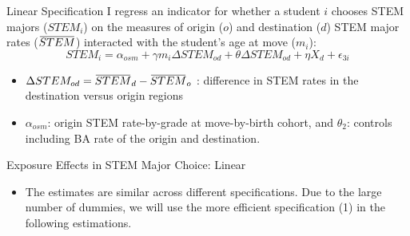 \documentclass[aspectratio=169,xcolor=dvipsnames]{beamer}
\newcommand{\overbar}[1]{\mkern 1.5mu\overline{\mkern-1.5mu#1\mkern-1.5mu}\mkern 1.5mu}
\begin{document}
\begin{frame}{Linear Specification}\label{}
I regress an indicator for whether a student $i$ chooses STEM majors ($STEM_i$) on the measures of origin ($o$) and destination ($d$) STEM major rates ($\overbar{STEM}$) interacted with the student’s age at move ($m_i$): 
\begin{equation}\label{eq:}
	  STEM_i =  \alpha_{osm} + \gamma m_i \Delta STEM_{od} + \theta \Delta STEM_{od} + \eta X_{d} + \epsilon_{3i}
    \end{equation}
\begin{itemize}
    \item $\Delta STEM_{od} = \overbar{STEM}_d -  \overbar{STEM}_o$ : difference in STEM rates in the destination versus origin regions
    \item $\alpha_{osm}$: origin STEM rate-by-grade at move-by-birth cohort, and $\theta_2$: controls including BA rate of the origin and destination.

\end{itemize}
\end{frame}

\begin{frame}{Exposure Effects in STEM Major Choice: Linear}\label{tab_main}
    \begin{table}[!htbp]
	\centering \footnotesize
	\captionsetup{width=1.0\textwidth}	
\end{table}
\vspace{-0.2cm}
\begin{itemize}
    \item The estimates are similar across different specifications. Due to the large number of dummies, we will use the more efficient specification (1) in the following estimations.
     \hyperlink{enrol_cutoff}{} 
    
\end{itemize}

\end{frame}
\end{document}
